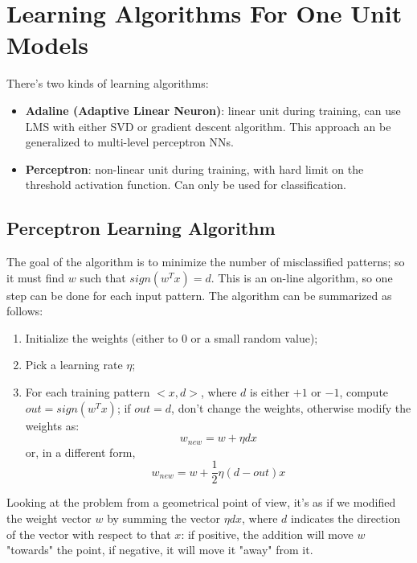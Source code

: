 \section{Learning Algorithms For One Unit Models}

There's two kinds of learning algorithms:
\begin{itemize}
    \item \textbf{Adaline (Adaptive Linear Neuron)}: linear unit during training, can use LMS with either SVD or gradient descent algorithm. This approach an be generalized to multi-level perceptron NNs.

    \item \textbf{Perceptron}: non-linear unit during training, with hard limit on the threshold activation function. Can only be used for classification.
\end{itemize}

\subsection{Perceptron Learning Algorithm}

The goal of the algorithm is to minimize the number of misclassified patterns; so it must find $w$ such that $sign(w^Tx)=d$. This is an on-line algorithm, so one step can be done for each input pattern. The algorithm can be summarized as follows:

\begin{enumerate}
    \item Initialize the weights (either to 0 or a small random value);

    \item Pick a learning rate $\eta$;

    \item For each training pattern $<x,d>$, where $d$ is either $+1$ or $-1$, compute $out = sign(w^Tx)$; if $out = d$, don't change the weights, otherwise modify the weights as:
    \begin{equation*}
        w_{new} = w + \eta d x
    \end{equation*}
    or, in a different form,
    \begin{equation*}
        w_{new} = w + \frac{1}{2} \eta (d-out) x
    \end{equation*}
\end{enumerate}

Looking at the problem from a geometrical point of view, it's as if we modified the weight vector $w$ by summing the vector $\eta d x$, where $d$ indicates the direction of the vector with respect to that $x$: if positive, the addition will move $w$ "towards" the point, if negative, it will move it "away" from it.

